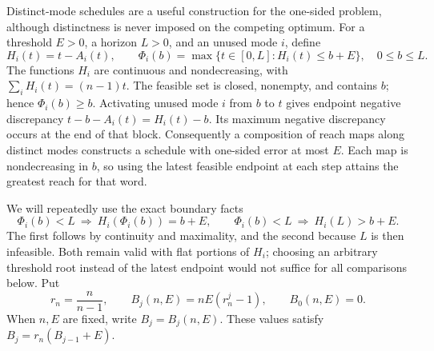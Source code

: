 Distinct-mode schedules are a useful construction for the one-sided
problem, although distinctness is never imposed on the competing optimum.
For a threshold $E>0$, a horizon $L>0$, and an unused mode $i$, define
\begin{equation}\label{eq:reach-definition}
 H_i(t)=t-A_i(t),\qquad
 \Phi_i(b)=\max\{t\in[0,L]:H_i(t)\le b+E\},\quad 0\le b\le L.
\end{equation}
The functions $H_i$ are continuous and nondecreasing, with
$\sum_iH_i(t)=(n-1)t$. The feasible set is closed, nonempty, and contains
$b$; hence $\Phi_i(b)\ge b$. Activating unused mode $i$ from $b$ to $t$
gives endpoint negative discrepancy $t-b-A_i(t)=H_i(t)-b$.
Its maximum negative discrepancy occurs at the end of that block.
Consequently a composition of reach maps along distinct modes constructs
a schedule with one-sided error at most $E$. Each map is nondecreasing in
$b$, so using the latest feasible endpoint at each step attains the greatest
reach for that word.

We will repeatedly use the exact boundary facts
\begin{equation}\label{eq:reach-boundary}
 \Phi_i(b)<L\ \Longrightarrow\ H_i(\Phi_i(b))=b+E,
 \qquad
 \Phi_i(b)<L\ \Longrightarrow\ H_i(L)>b+E.
\end{equation}
The first follows by continuity and maximality, and the second because
$L$ is then infeasible. Both remain valid with flat portions of $H_i$;
choosing an arbitrary threshold root instead of the latest endpoint would
not suffice for all comparisons below. Put
\begin{equation}\label{eq:B-def}
 r_n=\frac{n}{n-1},\qquad B_j(n,E)=nE(r_n^j-1),\qquad B_0(n,E)=0.
\end{equation}
When $n,E$ are fixed, write $B_j=B_j(n,E)$. These values satisfy
$B_j=r_n(B_{j-1}+E)$.

